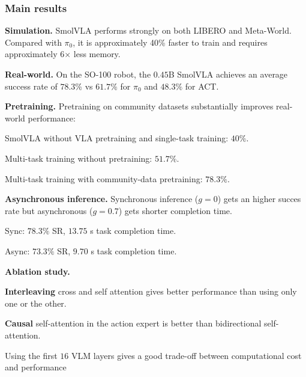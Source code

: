 \subsubsection{Main results}

\begin{dashlist}
    \item \textbf{Simulation.} SmolVLA performs strongly on both LIBERO and Meta-World. Compared with $\pi_0$, it is approximately 40\% faster to train and requires approximately 6$\times$ less memory.
    \item \textbf{Real-world.} On the SO-100 robot, the $0.45$B SmolVLA achieves an average success rate of \textbf{$78.3\%$} vs $61.7\%$ for $\pi_0$ and $48.3\%$ for ACT.
    \item \textbf{Pretraining.} Pretraining on community datasets substantially improves real-world performance:
    \begin{dashlist}
        \item SmolVLA without VLA pretraining and single-task training: $40\%$.
        \item Multi-task training without pretraining: $51.7\%$.
        \item Multi-task training with community-data pretraining: \textbf{$78.3\%$}.
    \end{dashlist}

    \item \textbf{Asynchronous inference.} Synchronous inference ($g=0$) gets an higher succes rate but asynchronous ($g=0.7$) gets shorter completion time.
    \begin{dashlist}
        \item Sync: $78.3\%$ SR, $13.75$ s task completion time.
        \item Async: $73.3\%$ SR, $9.70$ s task completion time.
    \end{dashlist}
    
    \item \textbf{Ablation study.}

    \begin{dashlist}
        \item \textbf{Interleaving} cross and self attention gives better performance than using only one or the other.

        \item \textbf{Causal} self-attention in the action expert is better than bidirectional self-attention.

        \item Using the first $16$ VLM layers gives a good trade-off between computational cost and performance
        

\end{dashlist}
\end{dashlist}
